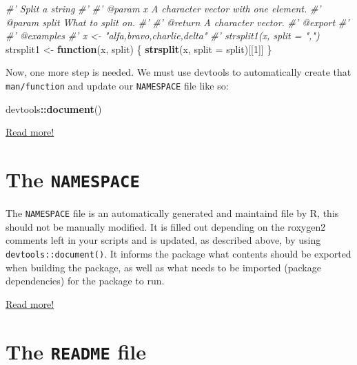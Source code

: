 \documentclass[
]{book}
\newenvironment{Shaded}{\begin{snugshade}}{\end{snugshade}}
\newcommand{\CommentTok}[1]{\textcolor[rgb]{0.56,0.35,0.01}{\textit{#1}}}
\newcommand{\ControlFlowTok}[1]{\textcolor[rgb]{0.13,0.29,0.53}{\textbf{#1}}}
\newcommand{\DataTypeTok}[1]{\textcolor[rgb]{0.13,0.29,0.53}{#1}}
\newcommand{\DecValTok}[1]{\textcolor[rgb]{0.00,0.00,0.81}{#1}}
\newcommand{\KeywordTok}[1]{\textcolor[rgb]{0.13,0.29,0.53}{\textbf{#1}}}
\newcommand{\NormalTok}[1]{#1}
\newcommand{\OperatorTok}[1]{\textcolor[rgb]{0.81,0.36,0.00}{\textbf{#1}}}
\newcommand{\StringTok}[1]{\textcolor[rgb]{0.31,0.60,0.02}{#1}}
\begin{document}
\begin{Shaded}
\begin{Highlighting}[]
\CommentTok{#' Split a string}
\CommentTok{#'}
\CommentTok{#' @param x A character vector with one element.}
\CommentTok{#' @param split What to split on.}
\CommentTok{#'}
\CommentTok{#' @return A character vector.}
\CommentTok{#' @export}
\CommentTok{#'}
\CommentTok{#' @examples}
\CommentTok{#' x <- "alfa,bravo,charlie,delta"}
\CommentTok{#' strsplit1(x, split = ",")}
\NormalTok{strsplit1 <-}\StringTok{ }\ControlFlowTok{function}\NormalTok{(x, split) \{}
  \KeywordTok{strsplit}\NormalTok{(x, }\DataTypeTok{split =}\NormalTok{ split)[[}\DecValTok{1}\NormalTok{]]}
\NormalTok{\}}
\end{Highlighting}
\end{Shaded}

Now, one more step is needed. We must use devtools to automatically create that \texttt{man/function} and update our \texttt{NAMESPACE} file like so:

\begin{Shaded}
\begin{Highlighting}[]
\NormalTok{devtools}\OperatorTok{::}\KeywordTok{document}\NormalTok{()}
\end{Highlighting}
\end{Shaded}

\href{https://r-pkgs.org/man.html}{Read more!}

\hypertarget{the-namespace}{%
\section{\texorpdfstring{The \texttt{NAMESPACE}}{The NAMESPACE}}\label{the-namespace}}

The \texttt{NAMESPACE} file is an automatically generated and maintaind file by R, this should not be manually modified. It is filled out depending on the roxygen2 comments left in your scripts and is updated, as described above, by using \texttt{devtools::document()}. It informs the package what contents should be exported when building the package, as well as what needs to be imported (package dependencies) for the package to run.

\href{https://r-pkgs.org/dependencies-mindset-background.html\#sec-dependencies-namespace}{Read more!}

\hypertarget{the-readme-file}{%
\section{\texorpdfstring{The \texttt{README} file}{The README file}}\label{the-readme-file}}
\end{document}
